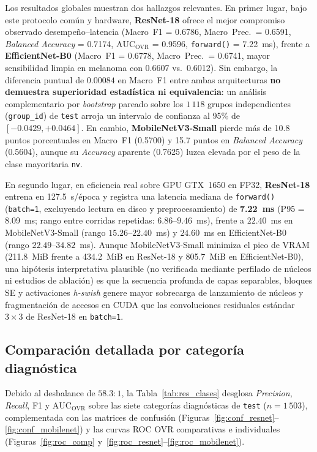 Los resultados globales muestran dos hallazgos relevantes. En primer lugar, bajo este protocolo común y hardware, \textbf{ResNet-18} ofrece el mejor compromiso observado desempeño--latencia (Macro~F1 = 0.6786, Macro~Prec.\ = 0.6591, \textit{Balanced Accuracy} = 0.7174, $\mathrm{AUC}_{\mathrm{OVR}}$ = 0.9596, \texttt{forward()} = 7.22~ms), frente a \textbf{EfficientNet-B0} (Macro~F1 = 0.6778, Macro~Prec.\ = 0.6741, mayor sensibilidad limpia en melanoma con 0.6607 vs.\ 0.6012). Sin embargo, la diferencia puntual de $0.00084$ en Macro~F1 entre ambas arquitecturas \textbf{no demuestra superioridad estadística ni equivalencia}: un análisis complementario por \textit{bootstrap} pareado sobre los $1\,118$ grupos independientes (\texttt{group\_id}) de \texttt{test} arroja un intervalo de confianza al 95\% de $[-0.0429, +0.0464]$. En cambio, \textbf{MobileNetV3-Small} pierde más de 10.8 puntos porcentuales en Macro~F1 (0.5700) y 15.7 puntos en \textit{Balanced Accuracy} (0.5604), aunque su \textit{Accuracy} aparente (0.7625) luzca elevada por el peso de la clase mayoritaria \texttt{nv}.

En segundo lugar, en eficiencia real sobre GPU GTX~1650 en FP32, \textbf{ResNet-18} entrena en 127.5~s/época y registra una latencia mediana de \texttt{forward()} (\texttt{batch=1}, excluyendo lectura en disco y preprocesamiento) de \textbf{7.22~ms} (P95 = 8.09~ms; rango entre corridas repetidas: $6.86$--$9.46$~ms), frente a $22.40$~ms en MobileNetV3-Small (rango $15.26$--$22.40$~ms) y $24.60$~ms en EfficientNet-B0 (rango $22.49$--$34.82$~ms). Aunque MobileNetV3-Small minimiza el pico de VRAM (211.8~MiB frente a 434.2~MiB en ResNet-18 y 805.7~MiB en EfficientNet-B0), una hipótesis interpretativa plausible (no verificada mediante perfilado de núcleos ni estudios de ablación) es que la secuencia profunda de capas separables, bloques SE y activaciones \textit{h-swish} genere mayor sobrecarga de lanzamiento de núcleos y fragmentación de accesos en CUDA que las convoluciones residuales estándar $3\times 3$ de ResNet-18 en \texttt{batch=1}.

\FloatBarrier
\subsection{Comparación detallada por categoría diagnóstica}
Debido al desbalance de $58.3:1$, la Tabla~\ref{tab:res_clases} desglosa \textit{Precision}, \textit{Recall}, F1 y $\mathrm{AUC}_{\mathrm{OVR}}$ sobre las siete categorías diagnósticas de \texttt{test} ($n=1\,503$), complementada con las matrices de confusión (Figuras~\ref{fig:conf_resnet}--\ref{fig:conf_mobilenet}) y las curvas ROC OVR comparativas e individuales (Figuras~\ref{fig:roc_comp} y~\ref{fig:roc_resnet}--\ref{fig:roc_mobilenet}).

